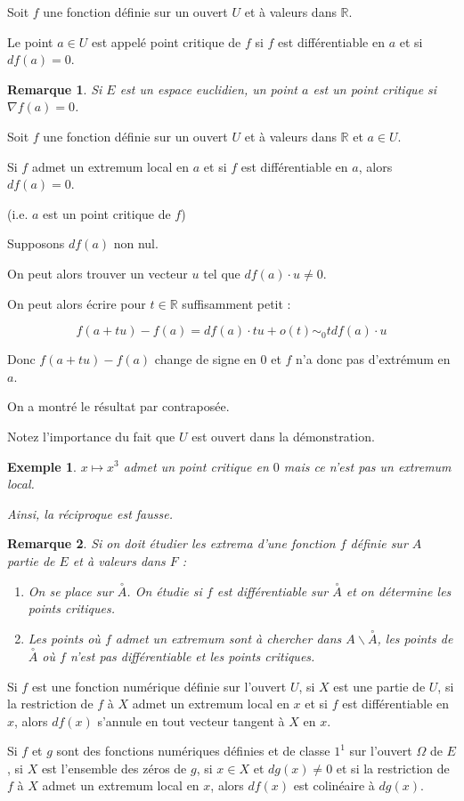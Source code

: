 \documentclass[a4paper,12pt]{book}
\newcommand{\Def}[2]{\begin{tcolorbox}[sharp corners, colback=white,colframe=blue!90!black!75, title=Définition : #1]#2\end{tcolorbox}}
\newcommand{\Thr}[2]{\begin{tcolorbox}[sharp corners, colback=white,colframe=red!90!black!75, title=Théorème : #1]#2\end{tcolorbox}}
\newcommand{\Prop}[2]{\begin{tcolorbox}[sharp corners, colback=white,colframe=red!90!black!75, title=Proposition : #1]#2\end{tcolorbox}}
\newcommand{\Pre}[1]{\begin{tcolorbox}[sharp corners, colback=white,colframe=green!60!green!30!black!75, title=Preuve]#1\end{tcolorbox}}
\newtheorem{Exe}{Exemple}[section]
\newtheorem{Rem}{Remarque}[section]
\def\R{\mathbb{R}}
\begin{document}
\Def{}{Soit $f$ une fonction définie sur un ouvert $U$ et à valeurs dans $\R$.
\par Le point $a\in U$ est appelé point critique de $f$ si $f$ est différentiable en $a$ et si $df(a)=0$.}
\begin{Rem}
Si $E$ est un espace euclidien, un point $a$ est un point critique si $\nabla f(a)=0$.
\end{Rem}
\Prop{}{Soit $f$ une fonction définie sur un ouvert $U$ et à valeurs dans $\R$ et $a\in U$.
\par Si $f$ admet un extremum local en $a$ et si $f$ est différentiable en $a$, alors $df(a)=0$.
\par (i.e. $a$ est un point critique de $f$)}
\Pre{Supposons $df(a)$ non nul.
\par On peut alors trouver un vecteur $u$ tel que $df(a)\cdot u\neq 0$.
\par On peut alors écrire pour $t\in\R$ suffisamment petit :
\par $$f(a+tu) -f(a) = df(a)\cdot tu+o(t)\sim_0 tdf(a)\cdot u$$
\par Donc $f(a+tu)-f(a)$ change de signe en $0$ et $f$ n'a donc pas d'extrémum en $a$.
\par On a montré le résultat par contraposée.
\par Notez l'importance du fait que $U$ est ouvert dans la démonstration.}
\begin{Exe}
$x\mapsto x^3$ admet un point critique en $0$ mais ce n'est pas un extremum local.
\par Ainsi, la réciproque est fausse.
\end{Exe}
\begin{Rem}
Si on doit étudier les extrema d'une fonction $f$ définie sur $A$ partie de $E$ et à valeurs dans $F$ :\begin{enumerate}
\item On se place sur $\overset{\circ}{A}$. On étudie si $f$ est différentiable sur $\overset{\circ}{A}$ et on détermine les points critiques.
\item Les points où $f$ admet un extremum sont à chercher dans $A\backslash\overset{\circ}{A}$, les points de $\overset{\circ}{A}$ où $f$ n'est pas différentiable et les points critiques.
\end{enumerate}
\end{Rem}
\Prop{}{Si $f$ est une fonction numérique définie sur l'ouvert $U$, si $X$ est une partie de $U$, si la restriction de $f$ à $X$ admet un extremum local en $x$ et si $f$ est différentiable en $x$, alors $df(x)$ s'annule en tout vecteur tangent à $X$ en $x$.}
\Thr{optimisation sous une contrainte}{Si $f$ et $g$ sont des fonctions numériques définies et de classe $\mathcal{1}^1$ sur l'ouvert $\Omega$ de $E$, si $X$ est l'ensemble des zéros de $g$, si $x\in X$ et $dg(x)\neq 0$ et si la restriction de $f$ à $X$ admet un extremum local en $x$, alors $df(x)$ est colinéaire à $dg(x)$.}
\end{document}
